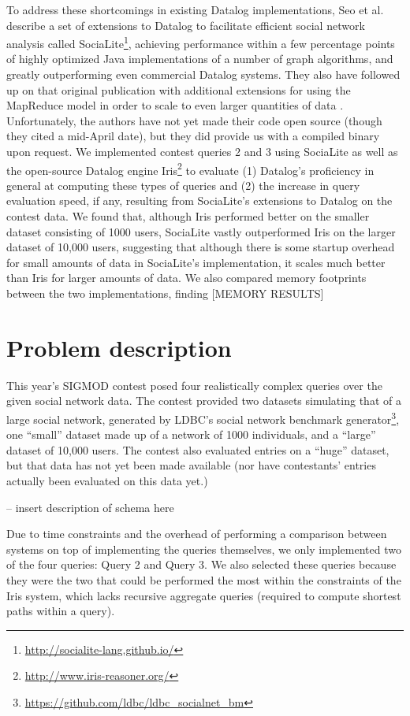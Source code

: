 \documentclass{article}
\begin{document}
\begin{multicols}{2}
To address these shortcomings in existing Datalog implementations, Seo et al. \cite{seo-et-al-13a} describe a set of extensions to Datalog to facilitate efficient social network analysis called SociaLite\footnote{\protect\url{http://socialite-lang.github.io/}}, achieving performance within a few percentage points of highly optimized Java implementations of a number of graph algorithms, and greatly outperforming even commercial Datalog systems. They also have followed up on that original publication with additional extensions for using the MapReduce model in order to scale to even larger quantities of data \cite{seo-et-al-13b}. Unfortunately, the authors have not yet made their code open source (though they cited a mid-April date), but they did provide us with a compiled binary upon request. We implemented contest queries 2 and 3 using SociaLite as well as the open-source Datalog engine Iris\footnote{\protect\url{http://www.iris-reasoner.org/}} to evaluate (1) Datalog's proficiency in general at computing these types of queries and (2) the increase in query evaluation speed, if any, resulting from SociaLite's extensions to Datalog on the contest data. We found that, although Iris performed better on the smaller dataset consisting of 1000 users, SociaLite vastly outperformed Iris on the larger dataset of 10,000 users, suggesting that although there is some startup overhead for small amounts of data in SociaLite's implementation, it scales much better than Iris for larger amounts of data. We also compared memory footprints between the two implementations, finding [MEMORY RESULTS]

\section{Problem description}

This year’s SIGMOD contest posed four realistically complex queries over the given social network data. The contest provided two datasets simulating that of a large social network, generated by LDBC's social network benchmark generator\footnote{\protect\url{https://github.com/ldbc/ldbc_socialnet_bm}}, one ``small'' dataset made up of a network of 1000 individuals, and a ``large'' dataset of 10,000 users. The contest also evaluated entries on a ``huge'' dataset, but that data has not yet been made available (nor have contestants' entries actually been evaluated on this data yet.) 

-- insert description of schema here

Due to time constraints and the overhead of performing a comparison between systems on top of implementing the queries themselves, we only implemented two of the four queries: Query 2 and Query 3. We also selected these queries because they were the two that could be performed the most within the constraints of the Iris system, which lacks recursive aggregate queries (required to compute shortest paths within a query).


\end{multicols}
\end{document}
